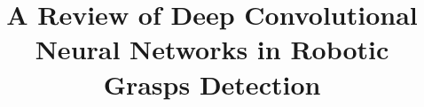 \documentclass{vldb}
\begin{document}

\title{A Review of Deep Convolutional Neural Networks in Robotic Grasps Detection}



%
%
%
%

\end{document}
